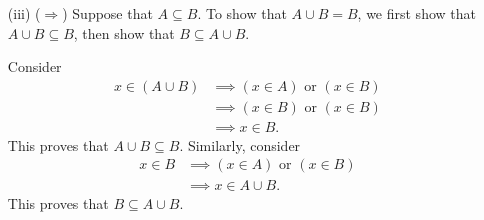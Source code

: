 \documentclass[10pt]{article}
\renewcommand{\lor}{\text{ or }}
\begin{document}
\begin{enumerate}
        Consider \begin{align*}
            x \in (A \cup B) \cup C
            &\implies (x \in A \cup B) \lor (x \in C) \\
            &\implies ((x \in A) \lor (x \in B)) \lor (x \in C) \\
            &\implies (x \in A) \lor (x \in B) \lor (x \in C) \\
            &\implies (x \in A) \lor ((x \in B) \lor (x \in C)) \\
            &\implies (x \in A) \lor (x \in B \cup C) \\
            &\implies x \in A \cup (B \cup C).
        \end{align*}
        This proves that $(A \cup B) \cup C \subseteq A \cup (B \cup C)$.
        Similarly, consider \begin{align*}
            x \in A \cup (B \cup C)
            &\implies (x \in A) \lor (x \in B \cup C) \\
            &\implies (x \in A) \lor ((x \in B) \lor (x \in C)) \\
            &\implies (x \in A) \lor (x \in B) \lor (x \in C) \\
            &\implies ((x \in A) \lor (x \in B)) \lor (x \in C) \\
            &\implies (x \in A \cup B) \lor (x \in C) \\
            &\implies x \in (A \cup B) \cup C.
        \end{align*}
        This proves that $A \cup (B \cup C) \subseteq (A \cup B) \cup C$. \qed


        \item[(iii)] ($\Rightarrow$) Suppose that $A \subseteq B$. To show
        that $A \cup B = B$, we first show that $A \cup B \subseteq B$, then
        show that $B \subseteq A \cup B$.

        Consider \begin{align*}
            x \in (A \cup B)
            &\implies (x \in A) \lor (x \in B) \\
            &\implies (x \in B) \lor (x \in B) \tag{Using $A \subseteq B$} \\
            &\implies x \in B.
        \end{align*}
        This proves that $A \cup B \subseteq B$. Similarly, consider
        \begin{align*}
            x \in B
            &\implies (x \in A) \lor (x \in B) \\
            &\implies x \in A \cup B.
        \end{align*}
        This proves that $B \subseteq A \cup B$.


\end{enumerate}
\end{document}
